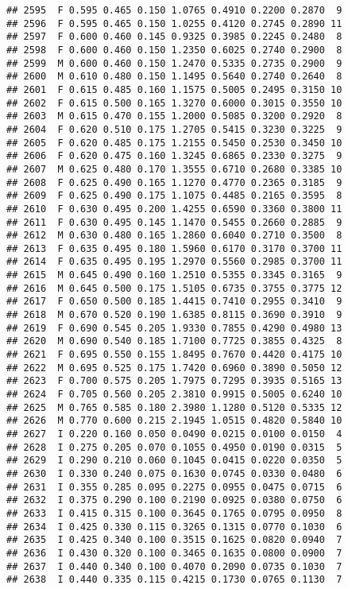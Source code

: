 \documentclass[
]{article}
\begin{document}
\begin{verbatim}
## 2595  F 0.595 0.465 0.150 1.0765 0.4910 0.2200 0.2870  9
## 2596  F 0.595 0.465 0.150 1.0255 0.4120 0.2745 0.2890 11
## 2597  F 0.600 0.460 0.145 0.9325 0.3985 0.2245 0.2480  8
## 2598  F 0.600 0.460 0.150 1.2350 0.6025 0.2740 0.2900  8
## 2599  M 0.600 0.460 0.150 1.2470 0.5335 0.2735 0.2900  9
## 2600  M 0.610 0.480 0.150 1.1495 0.5640 0.2740 0.2640  8
## 2601  F 0.615 0.485 0.160 1.1575 0.5005 0.2495 0.3150 10
## 2602  F 0.615 0.500 0.165 1.3270 0.6000 0.3015 0.3550 10
## 2603  M 0.615 0.470 0.155 1.2000 0.5085 0.3200 0.2920  8
## 2604  F 0.620 0.510 0.175 1.2705 0.5415 0.3230 0.3225  9
## 2605  F 0.620 0.485 0.175 1.2155 0.5450 0.2530 0.3450 10
## 2606  F 0.620 0.475 0.160 1.3245 0.6865 0.2330 0.3275  9
## 2607  M 0.625 0.480 0.170 1.3555 0.6710 0.2680 0.3385 10
## 2608  F 0.625 0.490 0.165 1.1270 0.4770 0.2365 0.3185  9
## 2609  F 0.625 0.490 0.175 1.1075 0.4485 0.2165 0.3595  8
## 2610  F 0.630 0.495 0.200 1.4255 0.6590 0.3360 0.3800 11
## 2611  F 0.630 0.495 0.145 1.1470 0.5455 0.2660 0.2885  9
## 2612  M 0.630 0.480 0.165 1.2860 0.6040 0.2710 0.3500  8
## 2613  F 0.635 0.495 0.180 1.5960 0.6170 0.3170 0.3700 11
## 2614  F 0.635 0.495 0.195 1.2970 0.5560 0.2985 0.3700 11
## 2615  M 0.645 0.490 0.160 1.2510 0.5355 0.3345 0.3165  9
## 2616  M 0.645 0.500 0.175 1.5105 0.6735 0.3755 0.3775 12
## 2617  F 0.650 0.500 0.185 1.4415 0.7410 0.2955 0.3410  9
## 2618  M 0.670 0.520 0.190 1.6385 0.8115 0.3690 0.3910  9
## 2619  F 0.690 0.545 0.205 1.9330 0.7855 0.4290 0.4980 13
## 2620  M 0.690 0.540 0.185 1.7100 0.7725 0.3855 0.4325  8
## 2621  F 0.695 0.550 0.155 1.8495 0.7670 0.4420 0.4175 10
## 2622  M 0.695 0.525 0.175 1.7420 0.6960 0.3890 0.5050 12
## 2623  F 0.700 0.575 0.205 1.7975 0.7295 0.3935 0.5165 13
## 2624  F 0.705 0.560 0.205 2.3810 0.9915 0.5005 0.6240 10
## 2625  M 0.765 0.585 0.180 2.3980 1.1280 0.5120 0.5335 12
## 2626  M 0.770 0.600 0.215 2.1945 1.0515 0.4820 0.5840 10
## 2627  I 0.220 0.160 0.050 0.0490 0.0215 0.0100 0.0150  4
## 2628  I 0.275 0.205 0.070 0.1055 0.4950 0.0190 0.0315  5
## 2629  I 0.290 0.210 0.060 0.1045 0.0415 0.0220 0.0350  5
## 2630  I 0.330 0.240 0.075 0.1630 0.0745 0.0330 0.0480  6
## 2631  I 0.355 0.285 0.095 0.2275 0.0955 0.0475 0.0715  6
## 2632  I 0.375 0.290 0.100 0.2190 0.0925 0.0380 0.0750  6
## 2633  I 0.415 0.315 0.100 0.3645 0.1765 0.0795 0.0950  8
## 2634  I 0.425 0.330 0.115 0.3265 0.1315 0.0770 0.1030  6
## 2635  I 0.425 0.340 0.100 0.3515 0.1625 0.0820 0.0940  7
## 2636  I 0.430 0.320 0.100 0.3465 0.1635 0.0800 0.0900  7
## 2637  I 0.440 0.340 0.100 0.4070 0.2090 0.0735 0.1030  7
## 2638  I 0.440 0.335 0.115 0.4215 0.1730 0.0765 0.1130  7

\end{verbatim}
\end{document}
